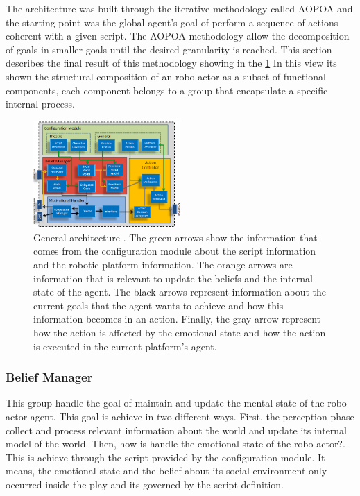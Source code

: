 The architecture was built through the iterative methodology called AOPOA and the starting point was the global agent's goal of perform a sequence of actions coherent with a given script. The AOPOA methodology allow the decomposition of goals in smaller goals until the desired granularity is reached. This section describes the final result of this methodology showing in the \ref{fig:generalArchitecture} In this view its shown the structural composition of an robo-actor as a subset of functional components, each component belongs to a group that encapsulate a specific internal process.
\begin{figure}
	\centering
	\includegraphics[width=0.5\textwidth]{Images/GeneralArchitecture.png} 
	\caption{General architecture . The green arrows show the information that comes from the configuration module about the script information and the robotic platform information. The orange arrows are information that is relevant to update the beliefs and the internal state of the agent. The black arrows represent information about the current goals that the agent wants to achieve and how this information becomes in an action. Finally, the gray arrow represent how the action is affected by the emotional state and how the action is executed in the current platform's agent.}
	\label{fig:generalArchitecture}
\end{figure}


\subsubsection{Belief Manager}

This group handle the goal of maintain and update the mental state of the robo-actor agent. This goal is achieve in two different ways. First, the perception phase collect and process relevant information about the world and update its internal model of the world. Then, how is handle the emotional state of the robo-actor?. This is achieve through the script provided by the configuration module. It means, the emotional state and the belief about its social environment only occurred inside the play and its governed by the script definition.

